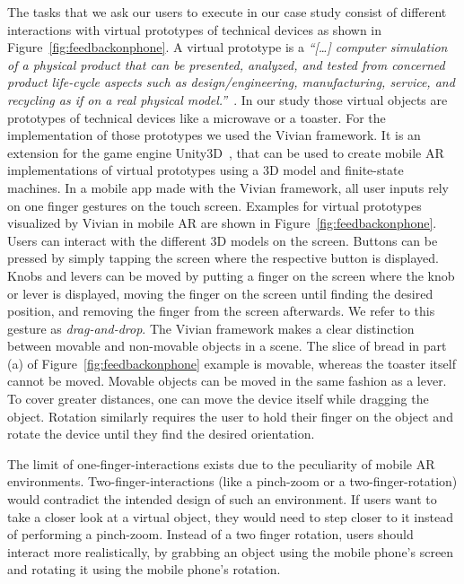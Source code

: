 \documentclass[manuscript]{acmart}
\begin{document}
		The tasks that we ask our users to execute in our case study consist of different interactions with virtual prototypes of technical devices as shown in Figure~\ref{fig:feedbackonphone}. A virtual prototype is a \textit{``\textnormal{[…]} computer simulation of a physical product that can be presented, analyzed, and tested from concerned product life-cycle aspects such as design/engineering, manufacturing, service, and recycling as if on a real physical model.''}~\cite{Wang2002}. In our study those virtual objects are prototypes of technical devices like a microwave or a toaster. For the implementation of those prototypes we used the Vivian framework. It is an extension for the game engine Unity3D~\cite{Unity}, that can be used to create mobile \ac{AR} implementations of virtual prototypes using a 3D model and finite-state machines. In a mobile app made with the Vivian framework, all user inputs rely on one finger gestures on the touch screen. Examples for virtual prototypes visualized by Vivian in mobile AR are shown in Figure~\ref{fig:feedbackonphone}. Users can interact with the different 3D models on the screen. Buttons can be pressed by simply tapping the screen where the respective button is displayed. Knobs and levers can be moved by putting a finger on the screen where the knob or lever is displayed, moving the finger on the screen until finding the desired position, and removing the finger from the screen afterwards. We refer to this gesture as \emph{drag-and-drop}. The Vivian framework makes a clear distinction between movable and non-movable objects in a scene. The slice of bread in part (a) of Figure~\ref{fig:feedbackonphone} example is movable, whereas the toaster itself cannot be moved. Movable objects can be moved in the same fashion as a lever. To cover greater distances, one can move the device itself while dragging the object. Rotation similarly requires the user to hold their finger on the object and rotate the device until they find the desired orientation.

		The limit of one-finger-interactions exists due to the peculiarity of mobile \ac{AR} environments. Two-finger-interactions (like a pinch-zoom or a two-finger-rotation) would contradict the intended design of such an environment. If users want to take a closer look at a virtual object, they would need to step closer to it instead of performing a pinch-zoom. Instead of a two finger rotation, users should interact more realistically, by grabbing an object using the mobile phone's screen and rotating it using the mobile phone's rotation.
\end{document}
